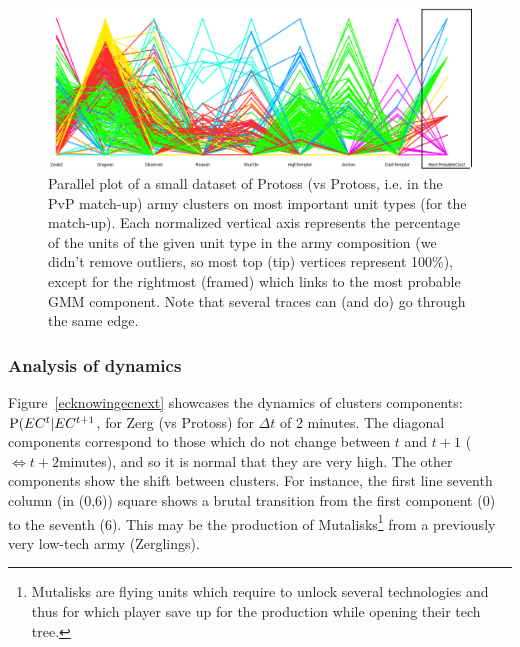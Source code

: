\begin{figure}[h]
\centerline{\includegraphics[width=1.12\columnwidth]{images/PvP_small.png}}
\caption{Parallel plot of a small dataset of Protoss (vs Protoss, i.e. in the PvP match-up) army clusters on most important unit types (for the match-up). Each normalized vertical axis represents the percentage of the units of the given unit type in the army composition (we didn't remove outliers, so most top (tip) vertices represent 100\%), except for the rightmost (framed) which links to the most probable GMM component. Note that several traces can (and do) go through the same edge.}
\label{fig:parallelplot}
\end{figure}

\subsubsection{Analysis of dynamics}

Figure~\ref{ecknowingecnext} showcases the dynamics of clusters components: $\mathrm{P}(EC^t|EC^{t+1}$, for Zerg (vs Protoss) for $\Delta t$ of 2 minutes. The diagonal components correspond to those which do not change between $t$ and $t+1$ ($\Leftrightarrow t+2$minutes), and so it is normal that they are very high. The other components show the shift between clusters. For instance, the first line seventh column (in (0,6)) square shows a brutal transition from the first component (0) to the seventh (6). This may be the production of Mutalisks\footnote{Mutalisks are flying units which require to unlock several technologies and thus for which player save up for the production while opening their tech tree.} from a previously very low-tech army (Zerglings).

